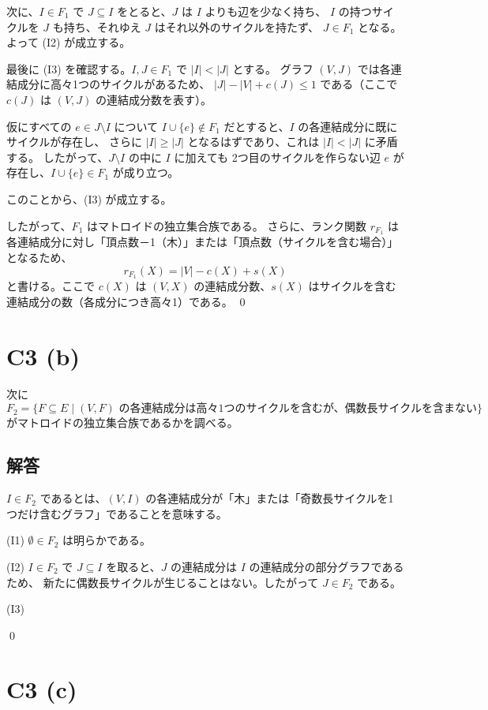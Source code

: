 \documentclass[a4paper]{ltjsarticle}
\begin{document}
次に、$I \in F_1$ で $J \subseteq I$ をとると、$J$ は $I$ よりも辺を少なく持ち、
$I$ の持つサイクルを $J$ も持ち、それゆえ $J$ はそれ以外のサイクルを持たず、
$J \in F_1$ となる。よって (I2) が成立する。

最後に (I3) を確認する。$I, J \in F_1$ で $|I| < |J|$ とする。
グラフ $(V,J)$ では各連結成分に高々1つのサイクルがあるため、
$|J| - |V| + c(J) \le 1$ である（ここで $c(J)$ は $(V,J)$ の連結成分数を表す）。

仮にすべての $e \in J \setminus I$ について
$I \cup \{e\} \notin F_1$ だとすると、$I$ の各連結成分に既にサイクルが存在し、
さらに $|I| \ge |J|$ となるはずであり、これは $|I| < |J|$ に矛盾する。
したがって、$J \setminus I$ の中に $I$ に加えても
2つ目のサイクルを作らない辺 $e$ が存在し、$I \cup \{e\} \in F_1$ が成り立つ。

このことから、(I3) が成立する。


したがって、$F_1$ はマトロイドの独立集合族である。
さらに、ランク関数 $r_{F_1}$ は各連結成分に対し「頂点数－1（木）」または「頂点数（サイクルを含む場合）」となるため、
\[
  r_{F_1}(X) = |V| - c(X) + s(X)
\]
と書ける。ここで $c(X)$ は $(V,X)$ の連結成分数、$s(X)$ はサイクルを含む連結成分の数（各成分につき高々1）である。
\qed

\section*{C3 (b)}

次に
\[
F_2 = \{ F \subseteq E \mid (V,F) \text{ の各連結成分は高々1つのサイクルを含むが、偶数長サイクルを含まない} \}
\]
がマトロイドの独立集合族であるかを調べる。

\subsection*{解答}
$I \in F_2$ であるとは、$(V,I)$ の各連結成分が「木」または「奇数長サイクルを1つだけ含むグラフ」であることを意味する。

(I1)
$\emptyset \in F_2$ は明らかである。

(I2)
$I \in F_2$ で $J \subseteq I$ を取ると、$J$ の連結成分は $I$ の連結成分の部分グラフであるため、
新たに偶数長サイクルが生じることはない。したがって $J \in F_2$ である。

(I3)

\qed


\section*{C3 (c)}
\end{document}
